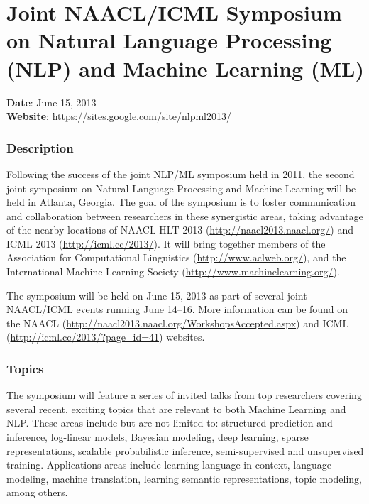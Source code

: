 \vspace*{-3cm}\par
\chapter[Joint NAACL/ICML Symposium: Saturday, June 15]{Joint NAACL/ICML Symposium on Natural Language Processing (NLP) and Machine Learning (ML)}
\thispagestyle{emptyheader}

\textbf{Date}: June 15, 2013 \\
\textbf{Website}: \url{https://sites.google.com/site/nlpml2013/}

\subsection*{Description}

Following the success of the joint NLP/ML symposium held in 2011, the second joint symposium on
Natural Language Processing and Machine Learning will be held in Atlanta, Georgia. The goal of the
symposium is to foster communication and collaboration between researchers in these synergistic
areas, taking advantage of the nearby locations of NAACL-HLT 2013
(\url{http://naacl2013.naacl.org/}) and ICML 2013 (\url{http://icml.cc/2013/}). It will bring
together members of the Association for Computational Linguistics (\url{http://www.aclweb.org/}),
and the International Machine Learning Society (\url{http://www.machinelearning.org/}).

The symposium will be held on June 15, 2013 as part of several joint NAACL/ICML events running June
14--16. More information can be found on the NAACL
(\url{http://naacl2013.naacl.org/WorkshopsAccepted.aspx}) and ICML
(\url{http://icml.cc/2013/?page_id=41}) websites.

\subsection*{Topics}

The symposium will feature a series of invited talks from top researchers covering several recent,
exciting topics that are relevant to both Machine Learning and NLP. These areas include but are not
limited to: structured prediction and inference, log-linear models, Bayesian modeling, deep
learning, sparse representations, scalable probabilistic inference, semi-supervised and unsupervised
training. Applications areas include learning language in context, language modeling, machine
translation, learning semantic representations, topic modeling, among others.

